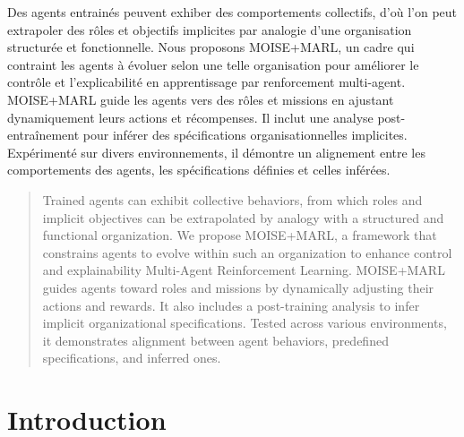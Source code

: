 \documentclass[dissemination]{jfsma}
\begin{document}
\maketitle

\begin{resume}
  Des agents entrainés peuvent exhiber des comportements collectifs, d'où l'on peut extrapoler des rôles et objectifs implicites par analogie d'une organisation structurée et fonctionnelle. Nous proposons MOISE+MARL, un cadre qui contraint les agents à évoluer selon une telle organisation pour améliorer le contrôle et l'explicabilité en apprentissage par renforcement multi-agent.
  MOISE+MARL guide les agents vers des rôles et missions en ajustant dynamiquement leurs actions et récompenses. Il inclut une analyse post-entraînement pour inférer des spécifications organisationnelles implicites. Expérimenté sur divers environnements, il démontre un alignement entre les comportements des agents, les spécifications définies et celles inférées.
\end{resume}



\begin{abstract}
  Trained agents can exhibit collective behaviors, from which roles and implicit objectives can be extrapolated by analogy with a structured and functional organization. We propose MOISE+MARL, a framework that constrains agents to evolve within such an organization to enhance control and explainability Multi-Agent Reinforcement Learning.
  MOISE+MARL guides agents toward roles and missions by dynamically adjusting their actions and rewards. It also includes a post-training analysis to infer implicit organizational specifications. Tested across various environments, it demonstrates alignment between agent behaviors, predefined specifications, and inferred ones.
\end{abstract}



\section{Introduction}

\end{document}
